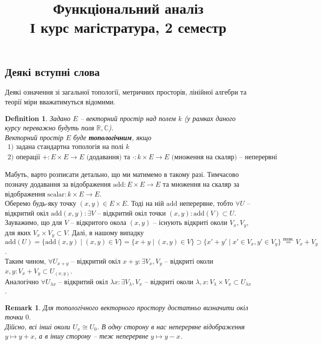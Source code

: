 \documentclass[a4paper, 10pt]{article}
\title{Функціональний аналіз \\ І курс магістратура, 2 семестр}
\theoremstyle{theoremdd}
\newtheorem{definition}[theorem]{Definition}
\newtheorem{remark}[theorem]{Remark}
\begin{document}
\maketitle
\newpage
\subsection{Деякі вступні слова}
Деякі означення зі загальної топології, метричних просторів, лінійної алгебри та теорії міри вважатимуться відомими.

\begin{definition}
Задано $E$ -- векторний простір над полем $k$ (у рамках даного курсу переважно будуть поля $\mathbb{R}, \mathbb{C}$).\\
Векторний простір $E$ буде \textbf{топологічним}, якщо
\begin{align*}
\text{1) задана стандартна топологія на полі } k \\
\text{2) операції $+ \colon E \times E \to E$ (додавання) та $\cdot \colon k \times E \to E$ (множення на скаляр) -- неперервні }
\end{align*}
\end{definition}
\noindent
Мабуть, варто розписати детально, що ми матимемо в такому разі. Тимчасово позначу додавання за відображення $\text{add} \colon E \times E \to E$ та множення на скаляр за відображення $\text{scalar} \colon k \times E \to E$.\\
Оберемо будь-яку точку $(x,y) \in E \times E$. Тоді на ній $\text{add}$ неперервне, тобто $\forall U$ -- відкритий окіл $\text{add}(x,y): \exists V$ -- відкритий окіл точки $(x,y): \text{add}(V) \subset U$. Зауважимо, що для $V$ -- відкритого окола $(x,y)$ -- існують відкриті околи $V_x,V_y$, для яких $V_x \times V_y \subset V$. Далі, в нашому випадку $\text{add}(U) = \{ \text{add}(x,y) \mid (x,y) \in V \} = \{x+y \mid (x,y) \in V\} \supset \{x'+y' \mid x' \in V_x, y' \in V_y\} \overset{\text{позн.}}{=} V_x + V_y$.
\bigskip \\
Таким чином, $\forall U_{x+y}$ -- відкритий окіл $x+y: \exists V_x,V_y$ -- відкриті околи $x,y: V_x + V_y \subset U_{(x,y)}$.\\
Аналогічно $\forall U_{\lambda x}$ -- відкритий окіл $\lambda x: \exists V_\lambda, V_x$ -- відкриті околи $\lambda, x: V_\lambda \times V_x \subset U_{\lambda x}$.

\begin{remark}
Для топологічного векторного простору достатньо визначити окіл точки $0$.\\
Дійсно, всі інші околи $U_x \cong U_0$. В одну сторону в нас неперервне відображення $y \mapsto y+x$, а в іншу сторону -- теж неперервне $y \mapsto y - x$.
\end{remark}
\end{document}

